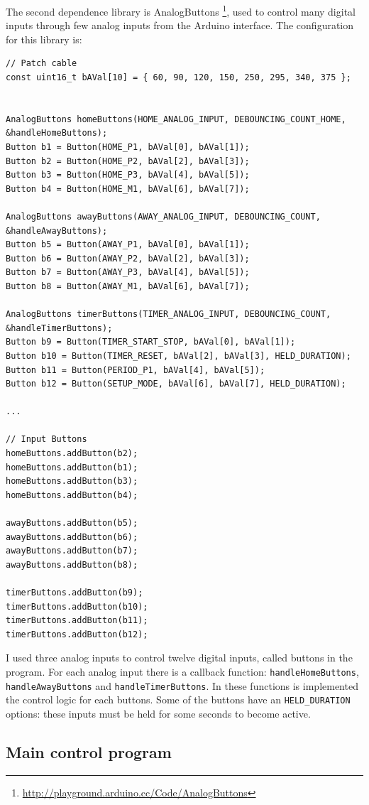 \documentclass[11pt,english]{article}
\newcommand{\code}[1]{\texttt{#1}}
\begin{document}
The second dependence library is AnalogButtons \footnote{\url{http://playground.arduino.cc/Code/AnalogButtons}},
used to control many digital inputs through few analog inputs from the Arduino interface. The configuration 
for this library is:
%
\begin{lstlisting}[label=lis:buttons-config,caption=AnalogButtons configuration]
// Patch cable
const uint16_t bAVal[10] = { 60, 90, 120, 150, 250, 295, 340, 375 };


AnalogButtons homeButtons(HOME_ANALOG_INPUT, DEBOUNCING_COUNT_HOME, &handleHomeButtons);
Button b1 = Button(HOME_P1, bAVal[0], bAVal[1]);
Button b2 = Button(HOME_P2, bAVal[2], bAVal[3]);
Button b3 = Button(HOME_P3, bAVal[4], bAVal[5]);
Button b4 = Button(HOME_M1, bAVal[6], bAVal[7]);

AnalogButtons awayButtons(AWAY_ANALOG_INPUT, DEBOUNCING_COUNT, &handleAwayButtons);
Button b5 = Button(AWAY_P1, bAVal[0], bAVal[1]);
Button b6 = Button(AWAY_P2, bAVal[2], bAVal[3]);
Button b7 = Button(AWAY_P3, bAVal[4], bAVal[5]);
Button b8 = Button(AWAY_M1, bAVal[6], bAVal[7]);

AnalogButtons timerButtons(TIMER_ANALOG_INPUT, DEBOUNCING_COUNT, &handleTimerButtons);
Button b9 = Button(TIMER_START_STOP, bAVal[0], bAVal[1]);
Button b10 = Button(TIMER_RESET, bAVal[2], bAVal[3], HELD_DURATION);
Button b11 = Button(PERIOD_P1, bAVal[4], bAVal[5]);
Button b12 = Button(SETUP_MODE, bAVal[6], bAVal[7], HELD_DURATION);

...

// Input Buttons
homeButtons.addButton(b2);
homeButtons.addButton(b1);
homeButtons.addButton(b3);
homeButtons.addButton(b4);

awayButtons.addButton(b5);
awayButtons.addButton(b6);
awayButtons.addButton(b7);
awayButtons.addButton(b8);

timerButtons.addButton(b9);
timerButtons.addButton(b10);
timerButtons.addButton(b11);
timerButtons.addButton(b12);

\end{lstlisting}

I used three analog inputs to control twelve digital inputs, called buttons in the program. 
For each analog input there is a callback function: \code{handleHomeButtons}, \code{handleAwayButtons}  
and \code{handleTimerButtons}. In these functions is implemented the control logic for each buttons.
Some of the buttons have an \code{HELD\_DURATION} options: these inputs must be held for some seconds to
become active.


\subsection{Main control program}
\end{document}
